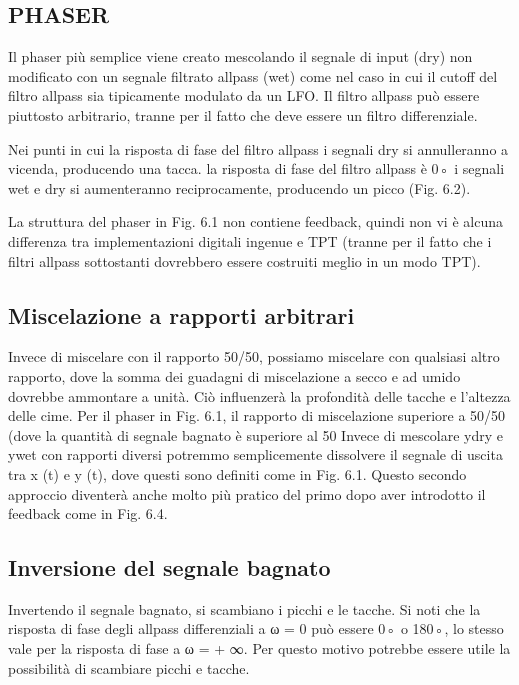 \subsection{PHASER}

Il phaser più semplice viene creato mescolando il segnale di input (dry) non
modificato con un segnale filtrato allpass (wet) come nel caso in cui il cutoff
del filtro allpass sia tipicamente modulato da un LFO. Il filtro allpass può
essere piuttosto arbitrario, tranne per il fatto che deve essere un filtro
differenziale.

Nei punti in cui la risposta di fase del filtro allpass i segnali dry si
annulleranno a vicenda, producendo una tacca. la risposta di fase del filtro
allpass è 0◦ i segnali wet e dry si aumenteranno reciprocamente, producendo un
picco (Fig. 6.2).

La struttura del phaser in Fig. 6.1 non contiene feedback, quindi non vi è
alcuna differenza tra implementazioni digitali ingenue e TPT (tranne per il
fatto che i filtri allpass sottostanti dovrebbero essere costruiti meglio in un
modo TPT).

\subsection{Miscelazione a rapporti arbitrari}

Invece di miscelare con il rapporto 50/50, possiamo miscelare con qualsiasi altro rapporto, dove la somma dei guadagni di miscelazione a secco e ad umido dovrebbe ammontare a unità. Ciò influenzerà la profondità delle tacche e l'altezza delle cime. Per il phaser in Fig. 6.1, il rapporto di miscelazione superiore a 50/50 (dove la quantità di segnale bagnato è superiore al 50%
Invece di mescolare ydry e ywet con rapporti diversi potremmo semplicemente dissolvere il segnale di uscita tra x (t) e y (t), dove questi sono definiti come in Fig. 6.1. Questo secondo approccio diventerà anche molto più pratico del primo dopo aver introdotto il feedback come in Fig. 6.4.

\subsection{Inversione del segnale bagnato}

Invertendo il segnale bagnato, si scambiano i picchi e le tacche. Si noti che la risposta di fase degli allpass differenziali a ω = 0 può essere 0◦ o 180◦, lo stesso vale per la risposta di fase a ω = + ∞. Per questo motivo potrebbe essere utile la possibilità di scambiare picchi e tacche.

